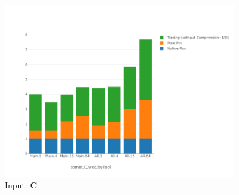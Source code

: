 \begin{figure}[!t]
\centering
\includegraphics[width=4in]{figs.comet.newMed/comet_chartDet_C_woc_byTool_p3_5.png}
\caption{ Input: \textbf{C}
}
\label{comet_chartDet_C_woc_byTool_p3_5}
\end{figure}



